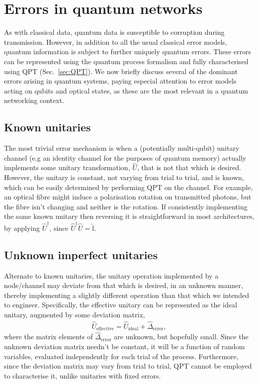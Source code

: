 %
%

\section{Errors in quantum networks} \label{sec:errors_in_nets} 

As with classical data, quantum data is susceptible to corruption during transmission. However, in addition to all the usual classical error models, quantum information is subject to further uniquely quantum errors. These errors can be represented using the quantum process formalism and fully characterised using QPT (Sec.~\ref{sec:QPT}). We now briefly discuss several of the dominant errors arising in quantum systems, paying especial attention to error models acting on qubits and optical states, as these are the most relevant in a quantum networking context.

%
%

\subsection{Known unitaries} 

The most trivial error mechanism is when a (potentially multi-qubit) unitary channel (e.g an identity channel for the purposes of quantum memory) actually implements some unitary transformation, $\hat{U}$, that is not that which is desired. However, the unitary is constant, not varying from trial to trial, and is known, which can be easily determined by performing QPT on the channel. For example, an optical fibre might induce a polarisation rotation on transmitted photons, but the fibre isn't changing and neither is the rotation. If consistently implementing the same known unitary then reversing it is straightforward in most architectures, by applying $\hat{U}^\dag$, since $\hat{U}^\dag\hat{U}=\hat{\mathbb{I}}$.

%
%

\subsection{Unknown imperfect unitaries} 

Alternate to known unitaries, the unitary operation implemented by a node/channel may deviate from that which is desired, in an unknown manner, thereby implementing a slightly different operation than that which we intended to engineer. Specifically, the effective unitary can be represented as the ideal unitary, augmented by some deviation matrix,
\begin{align}
	\hat{U}_\text{effective} = \hat{U}_\text{ideal} + \hat{\Delta}_\text{error},
\end{align}
where the matrix elements of $\hat{\Delta}_\text{error}$ are unknown, but hopefully small. Since the unknown deviation matrix needn't be constant, it will be a function of random variables, evaluated independently for each trial of the process. Furthermore, since the deviation matrix may vary from trial to trial, QPT cannot be employed to characterise it, unlike unitaries with fixed errors.

